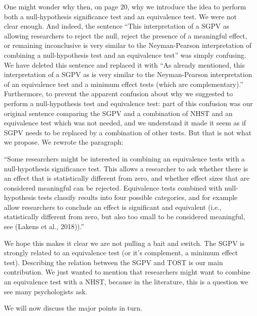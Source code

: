 \documentclass[man]{apa6}
\begin{document}
One might wonder why then, on page 20, why we introduce the idea to
perform both a null-hypothesis significance test and an equivalence
test. We were not clear enough. And indeed, the sentence \enquote{This
interpretation of a SGPV as allowing researchers to reject the null,
reject the presence of a meaningful effect, or remaining inconclusive is
very similar to the Neyman-Pearson interpretation of combining a
null-hypothesis test and an equivalence test} was simply confusing. We
have deleted this sentence and replaced it with \enquote{As already
mentioned, this interpretation of a SGPV as is very similar to the
Neyman-Pearson interpretation of an equivalence test and a minimum
effect tests (which are complementary).} Furthermore, to prevent the
apparent confusion about why we suggested to perform a null-hypothesis
test and equivalence test: part of this confusion was our original
sentence comparing the SGPV and a combination of NHST and an equivalence
test which was not needed, and we understand it made it seem as if SGPV
needs to be replaced by a combination of other tests. But that is not
what we propose. We rewrote the paragraph:

\enquote{Some researchers might be interested in combining an
equivalence tests with a null-hypothesis significance test. This allows
a researcher to ask whether there is an effect that is statistically
different from zero, and whether effect sizes that are considered
meaningful can be rejected. Equivalence tests combined with
null-hypothesis tests classify results into four possible categories,
and for example allow researchers to conclude an effect is significant
and equivalent (i.e., statistically different from zero, but also too
small to be considered meaningful, see (Lakens et al., 2018)).}

We hope this makes it clear we are not pulling a bait and switch. The
SGPV is strongly related to an equivalence test (or it's complement, a
minimum effect test). Describing the relation between the SGPV and TOST
is our main contribution. We just wanted to mention that researchers
might want to combine an equivalence test with a NHST, because in the
literature, this is a question we see many psychologists ask.

We will now discuss the major points in turn.
\end{document}
